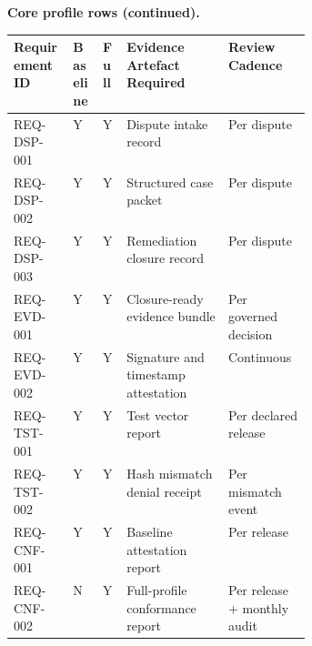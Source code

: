 \documentclass[11pt]{article}
\theoremstyle{definition}
\theoremstyle{plain}
\theoremstyle{remark}
\begin{document}
\textbf{Core profile rows (continued).}
\begin{center}
\small
\setlength{\tabcolsep}{7pt}
\renewcommand{\arraystretch}{1.22}
\begin{tabularx}{0.98\linewidth}{p{0.20\linewidth} p{0.10\linewidth} p{0.08\linewidth} Y Y}
\textbf{Requirement ID} & \textbf{Baseline} & \textbf{Full} & \textbf{Evidence Artefact Required} & \textbf{Review Cadence} \\ \hline
{}
REQ-DSP-001 & Y & Y & Dispute intake record & Per dispute \\
REQ-DSP-002 & Y & Y & Structured case packet & Per dispute \\
REQ-DSP-003 & Y & Y & Remediation closure record & Per dispute \\
REQ-EVD-001 & Y & Y & Closure-ready evidence bundle & Per governed decision \\
REQ-EVD-002 & Y & Y & Signature and timestamp attestation & Continuous \\
REQ-TST-001 & Y & Y & Test vector report & Per declared release \\
REQ-TST-002 & Y & Y & Hash mismatch denial receipt & Per mismatch event \\
REQ-CNF-001 & Y & Y & Baseline attestation report & Per release \\
REQ-CNF-002 & N & Y & Full-profile conformance report & Per release + monthly audit \\
\end{tabularx}
\end{center}
\end{document}
